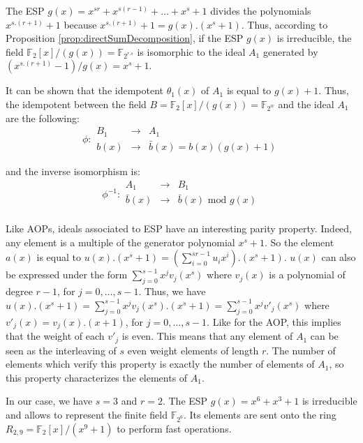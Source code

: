 \documentclass[conference]{IEEEtran}
\begin{document}
The ESP $g(x)=x^{sr}+x^{s(r-1)}+\ldots + x^s + 1$ divides the polynomials $x^{s.(r+1)}+ 1$ because $x^{s.(r+1)} + 1 = g(x).(x^s+1)$. Thus, according to Proposition \ref{prop:directSumDecomposition}, if the ESP $g(x)$ is irreducible, the field $\mathbb{F}_{2}[x]/(g(x))=\mathbb{F}_{2^{r.s}}$ is isomorphic to the ideal $A_1$ generated by $ (x^{s.(r+1)}-1)/g(x) = x^s+1$. 

It can be shown that the idempotent $\theta_1(x)$ of $A_1$ is equal to $g(x)+1$. 
Thus, the idempotent between the field $B=\mathbb{F}_{2}[x]/(g(x))=\mathbb{F}_{2^w}$ and the ideal $A_1$ are the following: 
\begin{equation}
\phi  :  \begin{array}{ccc}
B_1 & \rightarrow & A_1 \\
b(x) & \rightarrow & \bar{b}(x)=b(x)(g(x)+1) 
\end{array}
\end{equation}  	

and the inverse isomorphism is:
\begin{equation}
\phi^{-1}  :  \begin{array}{ccc}
A_1 & \rightarrow & B_1 \\
\bar{b}(x) & \rightarrow & \bar{b}(x)\textrm{ mod }g(x)\\
\end{array}
\end{equation} 

Like AOPs, ideals associated to ESP have an interesting parity property. Indeed, any element is a multiple of the generator polynomial $x^s+1$. So the element $a(x)$ is equal to $u(x).(x^s+1)=(\sum_{i=0}^{{sr}-1}u_i x^i).(x^s+1)$. $u(x)$ can also be expressed under the form $\sum_{j=0}^{s-1}x^jv_j(x^s)$ where $v_j(x)$ is a polynomial of degree $r-1$, for $j=0,\ldots,s-1$. Thus, we have  $u(x).(x^s+1)= \sum_{j=0}^{s-1}x^jv_j(x^s).(x^s+1)=\sum_{j=0}^{s-1}x^j v'_j(x^s)$ where $v'_j(x)=v_j(x).(x+1)$, for $j=0,\ldots,s-1$. Like for the AOP, this implies that the weight of each $v'_j$ is even. This means that any element of $A_1$ can be seen as the interleaving of $s$ even weight elements of length $r$. The number of elements which verify this property is exactly the number of elements of $A_1$, so this property characterizes the elements of $A_1$. 

In our case, we have $s=3$ and $r=2$. The ESP $g(x)=x^6+x^3+1$ is irreducible and allows to represent the finite field  $\mathbb{F}_{2^6}$. Its elements are sent onto the ring $R_{2,9}= \mathbb{F}_{2}[x]/(x^9+1)$ to perform fast operations.
\end{document}
